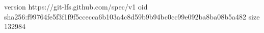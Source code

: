 version https://git-lfs.github.com/spec/v1
oid sha256:f99764fe5f3f1f9f5ccecca6b103a4c8d59b9b94bc0cc99e092ba8ba08b5a482
size 132984
